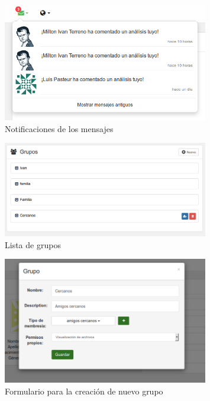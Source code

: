 	    \begin{figure}[h]
	    	\centering
	    	\includegraphics[width=0.8\textwidth]{img/notificacion_mensaje}
	    	\caption{Notificaciones de los mensajes}
	    	\label{notificacion_mensaje}
	    \end{figure}	
	    \begin{figure}[h]
	    	\centering
	    	\includegraphics[width=0.8\textwidth]{img/grupos}
	    	\caption{Lista de grupos}
	    	\label{grupos}
	    \end{figure}	    

	    \begin{figure}[h]
	    	\centering
	    	\includegraphics[width=0.8\textwidth]{img/nuevo_grupo}
	    	\caption{Formulario para la creación de nuevo grupo}
	    	\label{nuevo_grupo}
	    \end{figure}	    	    
	    
